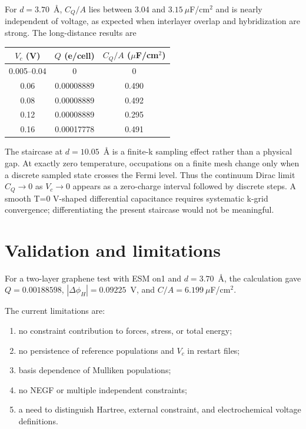 \documentclass[11pt,a4paper]{article}
\begin{document}
For $d=3.70$~\AA, $C_Q/A$ lies between 3.04 and
$3.15~\mu$F/cm$^2$ and is nearly independent of voltage, as expected when
interlayer overlap and hybridization are strong.  The long-distance results
are
\begin{center}
\begin{tabular}{ccc}
\hline
$V_c$ (V)&$Q$ (e/cell)&$C_Q/A$ ($\mu$F/cm$^2$)\\
\hline
0.005--0.04&0&0\\
0.06&0.00008889&0.490\\
0.08&0.00008889&0.492\\
0.12&0.00008889&0.295\\
0.16&0.00017778&0.491\\
\hline
\end{tabular}
\end{center}
The staircase at $d=10.05$~\AA{} is a finite-k sampling effect rather than a
physical gap.  At exactly zero temperature, occupations on a finite mesh
change only when a discrete sampled state crosses the Fermi level.  Thus the
continuum Dirac limit $C_Q\rightarrow0$ as $V_c\rightarrow0$ appears as a
zero-charge interval followed by discrete steps.  A smooth T=0 V-shaped
differential capacitance requires systematic k-grid convergence; differentiating
the present staircase would not be meaningful.

\section{Validation and limitations}

For a two-layer graphene test with ESM on1 and $d=3.70$~\AA, the
calculation gave $Q=0.00188598$, $|\Delta\phi_H|=0.09225$~V, and
$C/A=6.199~\mu$F/cm$^2$.

The current limitations are:
\begin{enumerate}
 \item no constraint contribution to forces, stress, or total energy;
 \item no persistence of reference populations and $V_c$ in restart files;
 \item basis dependence of Mulliken populations;
 \item no NEGF or multiple independent constraints;
 \item a need to distinguish Hartree, external constraint, and
       electrochemical voltage definitions.
\end{enumerate}
\end{document}
